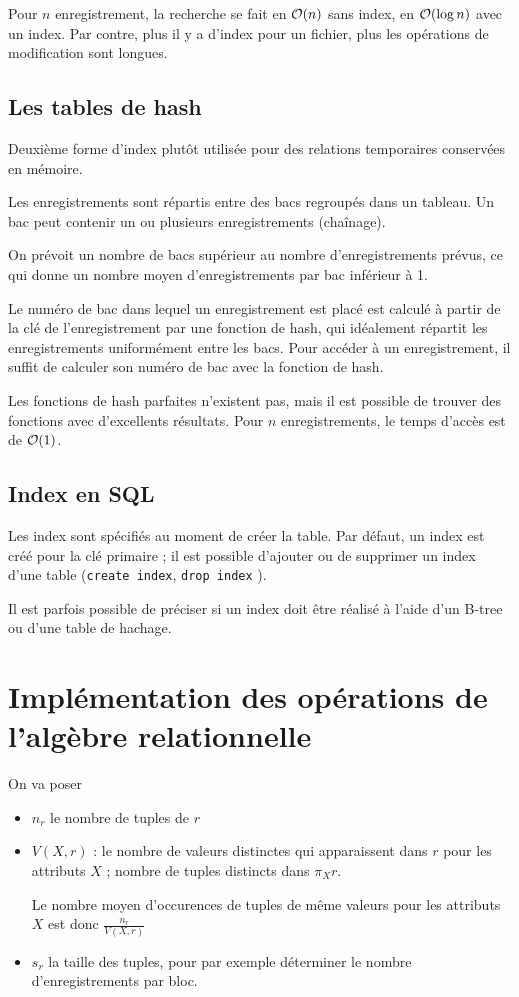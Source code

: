 		Pour $n$ enregistrement, la recherche se fait en $\mathcal{O}(n)$ sans index, en $\mathcal{O} (\log n)$ avec un index. Par contre, plus il y a d'index pour un fichier, plus les opérations de modification sont longues.
		
		\subsection{Les tables de hash}
		
		Deuxième forme d'index plutôt utilisée pour des relations temporaires conservées en mémoire.
		
		Les enregistrements sont répartis entre des bacs regroupés dans un tableau. Un bac peut contenir un ou plusieurs enregistrements (chaînage).
		
		On prévoit un nombre de bacs supérieur au nombre d'enregistrements prévus, ce qui donne un nombre moyen d'enregistrements par bac inférieur à 1. 
		
		Le numéro de bac dans lequel un enregistrement est placé est calculé à partir de la clé de l'enregistrement par une fonction de hash, qui idéalement répartit les enregistrements uniformément entre les bacs. Pour accéder à un enregistrement, il suffit de calculer son numéro de bac avec la fonction de hash.
		
		Les fonctions de hash parfaites n'existent pas, mais il est possible de trouver des fonctions avec d'excellents résultats. Pour $n$ enregistrements, le temps d'accès est de $\mathcal{O} (1)$.
	
	
		\subsection{Index en SQL}
		
		Les index sont spécifiés au moment de créer la table. Par défaut, un index est créé pour la clé primaire ; il est possible d'ajouter ou de supprimer un index d'une table (\texttt{create index}, \texttt{drop index} ).
	
		Il est parfois possible de préciser si un index doit être réalisé à l'aide d'un B-tree ou d'une table de hachage.
		
	\section{Implémentation des opérations de l'algèbre relationnelle}
	
	On va poser 
	
	\begin{itemize}
		\item $n_r$ le nombre de tuples de $r$
		\item $V(X, r)$ : le nombre de valeurs distinctes qui apparaissent dans $r$ pour les attributs $X$ ; nombre de tuples distincts dans $\pi_Xr$. 
		
		Le nombre moyen d'occurences de tuples de même valeurs pour les attributs $X$ est donc $\frac{n_r}{V(X,r)}$
		
		\item $s_r$ la taille des tuples, pour par exemple déterminer le nombre d'enregistrements par bloc.
	\end{itemize}
	
